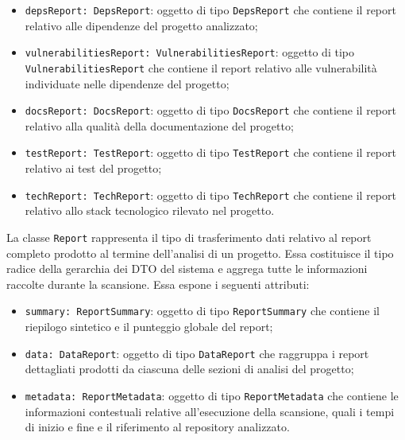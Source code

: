 \documentclass[a4paper, 11pt]{article}
\newcounter{subsubsubsection}[subsubsection]
\begin{document}
\begin{itemize}
  \item \texttt{depsReport: DepsReport}: oggetto di tipo \texttt{DepsReport} che contiene il
    report relativo alle dipendenze del progetto analizzato;
 
  \item \texttt{vulnerabilitiesReport: VulnerabilitiesReport}: oggetto di tipo
    \texttt{VulnerabilitiesReport} che contiene il report relativo alle vulnerabilità individuate
    nelle dipendenze del progetto;
 
  \item \texttt{docsReport: DocsReport}: oggetto di tipo \texttt{DocsReport} che contiene il
    report relativo alla qualità della documentazione del progetto;
 
  \item \texttt{testReport: TestReport}: oggetto di tipo \texttt{TestReport} che contiene il
    report relativo ai test del progetto;
 
  \item \texttt{techReport: TechReport}: oggetto di tipo \texttt{TechReport} che contiene il
    report relativo allo stack tecnologico rilevato nel progetto.
\end{itemize}

 \label{sec:Report}
 
La classe \texttt{Report} rappresenta il tipo di trasferimento dati relativo al report completo
prodotto al termine dell'analisi di un progetto. Essa costituisce il tipo radice della gerarchia
dei DTO del sistema e aggrega tutte le informazioni raccolte durante la scansione. Essa espone i
seguenti attributi:
 
\begin{itemize}
  \item \texttt{summary: ReportSummary}: oggetto di tipo \texttt{ReportSummary} che contiene il
    riepilogo sintetico e il punteggio globale del report;
 
  \item \texttt{data: DataReport}: oggetto di tipo \texttt{DataReport} che raggruppa i report
    dettagliati prodotti da ciascuna delle sezioni di analisi del progetto;
 
  \item \texttt{metadata: ReportMetadata}: oggetto di tipo \texttt{ReportMetadata} che contiene
    le informazioni contestuali relative all'esecuzione della scansione, quali i tempi di inizio e
    fine e il riferimento al repository analizzato.
\end{itemize}
\end{document}
